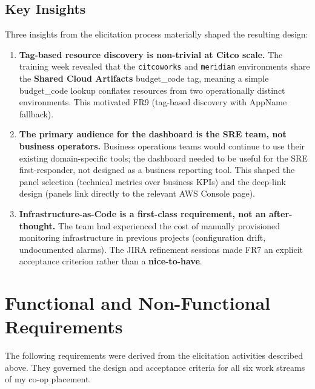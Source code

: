 \subsection{Key Insights}

Three insights from the elicitation process materially shaped the
resulting design:

\begin{enumerate}
    \item \textbf{Tag-based resource discovery is non-trivial at Citco
          scale.} The training week revealed that the \texttt{citcoworks}
          and \texttt{meridian} environments share the
          \textbf{Shared Cloud Artifacts} budget\_code tag, meaning
          a simple budget\_code lookup conflates resources from
          two operationally distinct environments. This
          motivated FR9 (tag-based discovery with AppName
          fallback).

    \item \textbf{The primary audience for the dashboard is the SRE
          team, not business operators.} Business operations teams would
          continue to use their existing domain-specific tools; the
          dashboard needed to be useful for the SRE first-responder,
          not designed as a business reporting tool. This shaped the
          panel selection (technical metrics over business KPIs) and
          the deep-link design (panels link directly to the relevant AWS
          Console page).

    \item \textbf{Infrastructure-as-Code is a first-class requirement,
          not an after-thought.} The team had experienced the cost of
          manually provisioned monitoring infrastructure in previous
          projects (configuration drift, undocumented alarms). The JIRA
          refinement sessions made FR7 an explicit acceptance criterion
          rather than a \textbf{nice-to-have}.
\end{enumerate}


\FloatBarrier

\section{Functional and Non-Functional Requirements}
\label{sec:requirements}


The following requirements were derived from the elicitation activities
described above. They governed the design and acceptance criteria for
all six work streams of my co-op placement.

